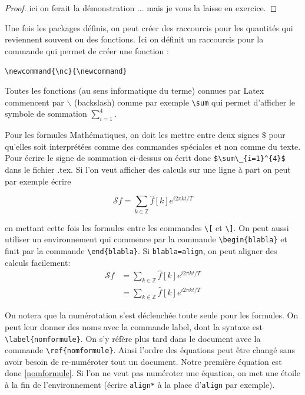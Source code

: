 \begin{proof}
 ici on ferait la démonstration ... mais  je vous la laisse en exercice.
\end{proof}



Une fois les packages définis, on peut créer des raccourcis pour les quantités qui reviennent 
souvent ou des fonctions. Ici on définit un raccourcis pour la commande qui permet de créer une
 fonction :\medskip

\lstinline+\newcommand{\nc}{\newcommand}+

\begin{rem}
 Toutes les fonctions (au sens informatique du terme) connues par Latex commencent par $\backslash$ 
(backslash) comme par exemple \lstinline+\sum+
 qui permet d'afficher le symbole de sommation $\sum_{i=1}^{4}$. 
\end{rem}


Pour les formules Mathématiques, on doit  les mettre entre deux signes 
$\$$ pour qu'elles soit interprétées comme des commandes spéciales et non comme du texte. 
Pour écrire le signe de sommation ci-dessus on écrit donc \lstinline+$\sum\_{i=1}^{4}$+ dans le 
fichier .tex. Si l'on veut afficher des calculs sur une ligne à part on peut par exemple écrire 

\[\mathcal{S}f = \sum_{k\in\mathbb{Z}} \hat{f}[k] e^{i2\pi kt/T} \] 

en mettant cette fois les formules  entre  les commandes 
\lstinline+\[+ et \lstinline+\]+. On peut aussi utiliser un environnement qui commence par la 
commande 
\lstinline+\begin{blabla}+ et finit par la commande \lstinline+\end{blabla}+. Si \lstinline+blabla=align+, 
on peut aligner des calculs facilement:
\begin{align}
 \mathcal{S}f & = \sum_{k\in\mathbb{Z}} \hat f[k] e^{i2\pi kt/T} \label{nomformule}\\
  & = \sum_{k\in\mathbb{Z}} \hat f[k] e^{i2\pi kt/T}
\end{align}

\begin{rem}
On notera que la numérotation s'est déclenchée toute seule pour les formules. 
On peut  leur donner des noms avec la commande label,  dont la syntaxe est  \lstinline+\label{nomformule}+.  
On s'y réfère plus tard dans le document  avec la commande \lstinline+\ref{nomformule}+. 
Ainsi l'ordre des équations peut être changé sans avoir besoin de re-numéroter tout un document. 
Notre première équation est donc \ref{nomformule}. 
Si l'on ne veut pas numéroter une équation,  on met une étoile à la fin de l'environnement 
(écrire \lstinline+align*+ à la place d'\lstinline+align+ par exemple).
\end{rem}




